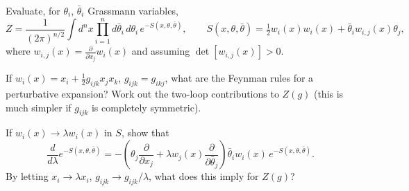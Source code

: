 Evaluate, for $\theta_i$, $\bar\theta_i$ Grassmann variables,
\begin{equation}
    Z = \frac{1}{(2\pi)^{n/2}}\int d^nx\prod_{i=1}^n d\bar\theta_i\,d\theta_i\,e^{-S(x,\theta,\bar\theta)}, \qquad S(x,\theta,\bar\theta) = \tfrac{1}{2}w_i(x)w_i(x) + \bar\theta_i w_{i,j}(x)\theta_j,
\end{equation}
where $w_{i,j}(x) = \frac{\partial}{\partial x_j}w_i(x)$ and assuming $\det[w_{i,j}(x)] > 0$.

If $w_i(x) = x_i + \frac{1}{2}g_{ijk}x_jx_k$, $g_{ijk} = g_{ikj}$, what are the Feynman rules for a perturbative expansion? Work out the two-loop contributions to $Z(g)$ (this is much simpler if $g_{ijk}$ is completely symmetric).

If $w_i(x)\to\lambda w_i(x)$ in $S$, show that
\begin{equation}
    \frac{d}{d\lambda}e^{-S(x,\theta,\bar\theta)} = -\left(\theta_j\frac{\partial}{\partial x_j} + \lambda w_j(x)\frac{\partial}{\partial\bar\theta_j}\right)\bar\theta_i w_i(x)\,e^{-S(x,\theta,\bar\theta)}.
\end{equation}
By letting $x_i\to\lambda x_i$, $g_{ijk}\to g_{ijk}/\lambda$, what does this imply for $Z(g)$?
